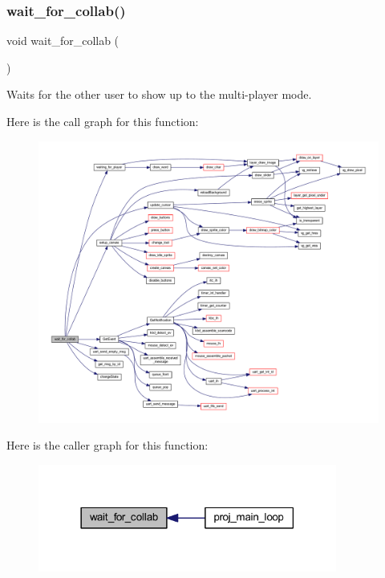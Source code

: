\subsubsection{\texorpdfstring{wait\+\_\+for\+\_\+collab()}{wait\_for\_collab()}}
{\footnotesize\ttfamily void wait\+\_\+for\+\_\+collab (\begin{DoxyParamCaption}{ }\end{DoxyParamCaption})}



Waits for the other user to show up to the multi-\/player mode. 

Here is the call graph for this function\+:
\nopagebreak
\begin{figure}[H]
\begin{center}
\leavevmode
\includegraphics[width=350pt]{group__pengoo_ga92c88d0b081234c242ddccf22be99782_cgraph}
\end{center}
\end{figure}
Here is the caller graph for this function\+:\nopagebreak
\begin{figure}[H]
\begin{center}
\leavevmode
\includegraphics[width=278pt]{group__pengoo_ga92c88d0b081234c242ddccf22be99782_icgraph}
\end{center}
\end{figure}
\mbox{\label{group__pengoo_ga45d4be7b19d3dd0ea742f0a489112c80}} 
